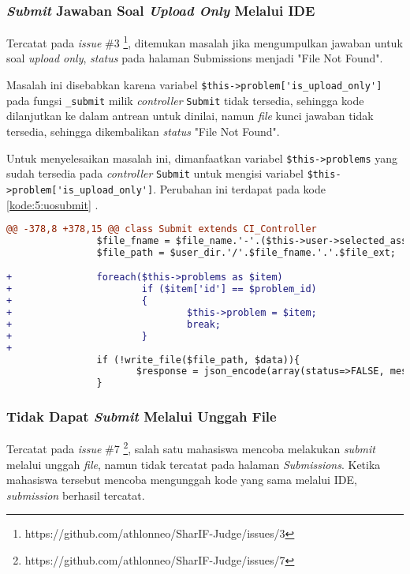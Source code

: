 \subsubsection{\textit{Submit} Jawaban Soal \textit{Upload Only} Melalui IDE}
Tercatat pada \textit{issue} \#3 \footnote{https://github.com/athlonneo/SharIF-Judge/issues/3}, ditemukan masalah jika mengumpulkan jawaban untuk soal \textit{upload only}, \textit{status} pada halaman Submissions menjadi "File Not Found".

Masalah ini disebabkan karena variabel \verb|$this->problem['is_upload_only']| pada fungsi \verb|_submit| milik \textit{controller} \verb|Submit| tidak tersedia, sehingga kode dilanjutkan ke dalam antrean untuk dinilai, namun \textit{file} kunci jawaban tidak tersedia, sehingga dikembalikan \textit{status} "File Not Found".

Untuk menyelesaikan masalah ini, dimanfaatkan variabel \verb|$this->problems| yang sudah tersedia pada \textit{controller} \verb|Submit| untuk mengisi variabel \verb|$this->problem['is_upload_only']|. Perubahan ini terdapat pada kode \ref{kode:5:uosubmit} .

\begin{lstlisting}[language=diff, caption=Perubahan pada \texttt{Submit.php}, label=kode:5:uosubmit]
@@ -378,8 +378,15 @@ class Submit extends CI_Controller
                $file_fname = $file_name.'-'.($this->user->selected_assignment['total_submits']+1);
                $file_path = $user_dir.'/'.$file_fname.'.'.$file_ext;

+               foreach($this->problems as $item)
+                       if ($item['id'] == $problem_id)
+                       {
+                               $this->problem = $item;
+                               break;
+                       }
+
                if (!write_file($file_path, $data)){
                       $response = json_encode(array(status=>FALSE, message=>'Unable to submit'));
                }
\end{lstlisting}

\subsubsection{Tidak Dapat \textit{Submit} Melalui Unggah File}
Tercatat pada \textit{issue} \#7 \footnote{https://github.com/athlonneo/SharIF-Judge/issues/7}, salah satu mahasiswa mencoba melakukan \textit{submit} melalui unggah \textit{file}, namun tidak tercatat pada halaman \textit{Submissions}. Ketika mahasiswa tersebut mencoba mengunggah kode yang sama melalui IDE, \textit{submission} berhasil tercatat. 

